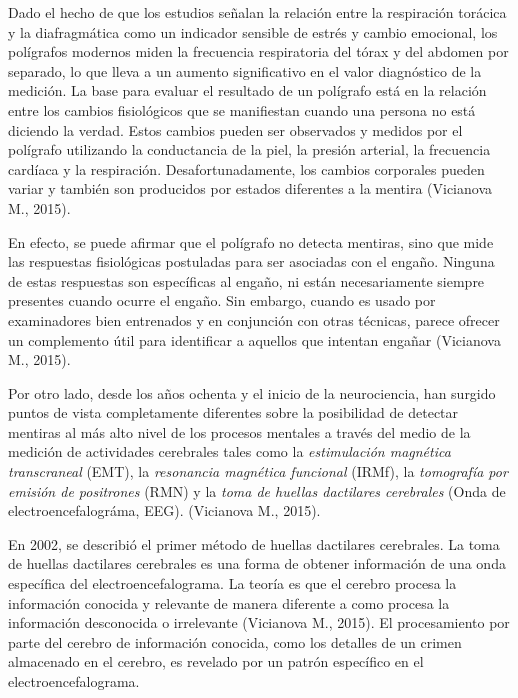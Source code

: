 Dado el hecho de que los estudios señalan la relación entre la respiración torácica y la diafragmática como un indicador sensible de estrés y cambio emocional, los polígrafos modernos miden la frecuencia respiratoria del tórax y del abdomen por separado, lo que lleva a un aumento significativo en el valor diagnóstico de la medición. La base para evaluar el resultado de un polígrafo está en la relación entre los cambios fisiológicos que se manifiestan cuando una persona no está diciendo la verdad. Estos cambios pueden ser observados y medidos por el polígrafo utilizando la conductancia de la piel, la presión arterial, la frecuencia cardíaca y la respiración. Desafortunadamente, los cambios corporales pueden variar y también son producidos por estados diferentes a la mentira (Vicianova M., 2015).  

En efecto, se puede afirmar que el polígrafo no detecta mentiras, sino que mide las respuestas fisiológicas postuladas para ser asociadas con el engaño. Ninguna de estas respuestas son específicas al engaño, ni están necesariamente siempre presentes cuando ocurre el engaño. Sin embargo, cuando es usado por examinadores bien entrenados y en conjunción con otras técnicas, parece ofrecer un complemento útil para identificar a aquellos que intentan engañar (Vicianova M., 2015). 

Por otro lado, desde los años ochenta y el inicio de la neurociencia, han surgido puntos de vista completamente diferentes sobre la posibilidad de detectar mentiras al más alto nivel de los procesos mentales a través del medio de la medición de actividades cerebrales tales como la \textit{estimulación magnética transcraneal} (EMT), la \textit{resonancia magnética funcional} (IRMf), la \textit{tomografía por emisión de positrones} (RMN) y la \textit{toma de huellas dactilares cerebrales} (Onda de electroencefalográma, EEG). (Vicianova M., 2015).

En 2002, se describió el primer método de huellas dactilares cerebrales. La toma de huellas dactilares cerebrales es una forma de obtener información de una onda específica del electroencefalograma. La teoría es que el cerebro procesa la información conocida y relevante de manera diferente a como procesa la información desconocida o irrelevante (Vicianova M., 2015). El procesamiento por parte del cerebro de información conocida, como los detalles de un crimen almacenado en el cerebro, es revelado por un patrón específico en el electroencefalograma.

